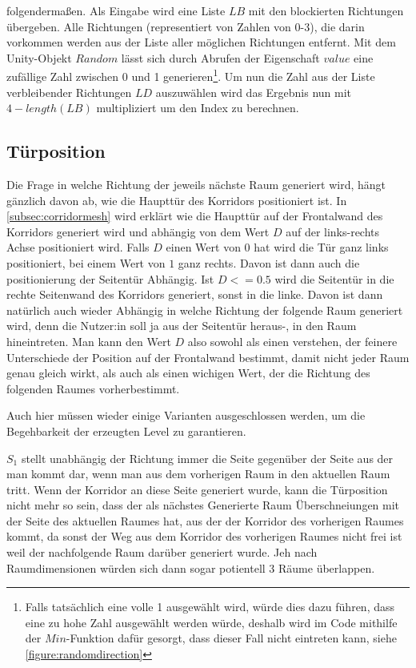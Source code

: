 folgendermaßen. Als Eingabe wird eine Liste $LB$ mit den blockierten Richtungen übergeben. Alle Richtungen (representiert von Zahlen von 0-3), die darin vorkommen werden aus der Liste aller möglichen Richtungen entfernt.
Mit dem Unity-Objekt $Random$ lässt sich durch Abrufen der Eigenschaft $value$ eine zufällige Zahl zwischen 0 und 1 generieren\footnote{Falls tatsächlich eine volle 1 ausgewählt wird, würde dies dazu führen, dass eine zu hohe Zahl ausgewählt werden würde, deshalb wird im Code mithilfe der $Min$-Funktion dafür gesorgt, dass dieser Fall nicht eintreten kann, siehe \autoref{figure:randomdirection}}.
Um nun die Zahl aus der Liste verbleibender Richtungen $LD$ auszuwählen wird das Ergebnis nun mit $4 - length(LB)$ multipliziert um den Index zu berechnen.

\subsection{Türposition}
Die Frage in welche Richtung der jeweils nächste Raum generiert wird, hängt gänzlich davon ab, wie die Haupttür des Korridors positioniert ist. In \autoref{subsec:corridormesh} wird erklärt wie die Haupttür auf der Frontalwand des Korridors generiert wird und abhängig von dem Wert $D$ auf der links-rechts Achse positioniert wird.
Falls $D$ einen Wert von $0$ hat wird die Tür ganz links positioniert, bei einem Wert von $1$ ganz rechts. Davon ist dann auch die positionierung der Seitentür Abhängig. Ist $D <= 0.5$ wird die Seitentür in die rechte Seitenwand des Korridors generiert, sonst in die linke.
Davon ist dann natürlich auch wieder Abhängig in welche Richtung der folgende Raum generiert wird, denn die Nutzer:in soll ja aus der Seitentür heraus-, in den Raum hineintreten.
Man kann den Wert $D$ also sowohl als einen verstehen, der feinere Unterschiede
der Position auf der Frontalwand bestimmt, damit nicht jeder Raum genau gleich wirkt, als auch als einen wichigen Wert, der die Richtung des folgenden Raumes vorherbestimmt.

Auch hier müssen wieder einige Varianten ausgeschlossen werden, um die Begehbarkeit der erzeugten Level zu garantieren.

$S_1$ stellt unabhängig der Richtung immer die Seite gegenüber der Seite aus der man kommt dar, wenn man aus dem vorherigen Raum in den aktuellen Raum tritt.
Wenn der Korridor an diese Seite generiert wurde, kann die Türposition nicht mehr so sein, dass der als nächstes Generierte Raum Überschneiungen mit der Seite des aktuellen Raumes hat, aus der der Korridor des vorherigen Raumes kommt, da sonst der Weg aus dem Korridor des vorherigen Raumes nicht frei ist weil der nachfolgende Raum darüber generiert wurde. Jeh nach Raumdimensionen würden sich dann sogar potientell 3 Räume überlappen.

